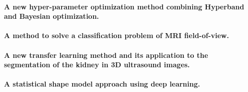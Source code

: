 \paragraph*{A new hyper-parameter optimization method combining Hyperband and Bayesian optimization.}


\paragraph*{A method to solve a classification problem of MRI field-of-view.}


\paragraph*{A new transfer learning method and its application to the segmentation of the kidney in 3D ultrasound images.}


\paragraph*{A statistical shape model approach using deep learning.}
